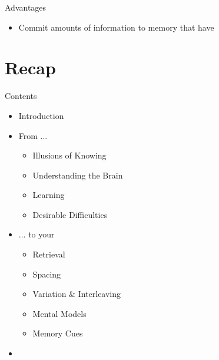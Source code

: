 \documentclass{ercisbeamer}
\begin{document}
\begin{frame}{Advantages}
    \begin{itemize}
        \item Commit  amounts of information to memory that have 
    \end{itemize}
\end{frame}

\section{Recap}
\begin{frame}{Contents}
    \begin{itemize}
        \item Introduction
        \item From ...
        \begin{itemize}
            \item Illusions of Knowing
            \item Understanding the Brain
            \item Learning
            \item Desirable Difficulties
        \end{itemize}
        \item ... to your 
        \begin{itemize}
            \item Retrieval
            \item Spacing
            \item Variation \& Interleaving
            \item Mental Models
            \item Memory Cues
        \end{itemize}
        \item {}
    \end{itemize}
\end{frame}
\end{document}
